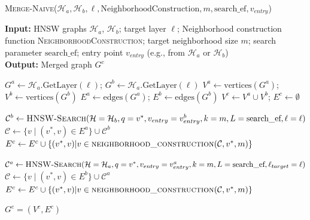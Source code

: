 \documentclass{article}
\begin{document}
\begin{algorithm}
\caption{\textsc{Merge-Naive}($\mathcal{H}_a, \mathcal{H}_b, \ell, \text{NeighborhoodConstruction}, m, \text{search\_ef}, v_{entry}$)}\label{alg:merge_naive}
\textbf{Input:} HNSW graphs $\mathcal{H}_a$, $\mathcal{H}_b$; target layer $\ell$; Neighborhood construction function \textsc{NeighborhoodConstruction}; target neighborhood size $m$; search parameter $\text{search\_ef}$; entry point $v_{entry}$ (e.g., from $\mathcal{H}_a$ or $\mathcal{H}_b$) \\
\textbf{Output:} Merged graph $G^c$
\begin{algorithmic}[1]
\State $G^a \gets \mathcal{H}_a\text{.GetLayer}(\ell) $; $G^b \gets\mathcal{H}_a\text{.GetLayer}(\ell)$ 
\State $V^a \gets \text{vertices}(G^a)$; $V^b \gets \text{vertices}(G^b)$
\State $E^a \gets \text{edges}(G^a)$; $E^b \gets \text{edges}(G^b)$
\State $V^c \gets V^a \cup V^b$; $E^c \gets \emptyset$ 

    \State $\mathcal{C}^b \gets \textsc{HNSW-Search}(\mathcal{H}=\mathcal{H}_b, q=v^*, v_{entry}=v_{entry}^b, k=m, L=\text{search\_ef}, \ell=\ell)$ 
    \State $\mathcal{C} \gets \{v \mid (v^*, v) \in E^a \} \cup \mathcal{C}^b$  
    \State $E^c \gets E^c \cup \{(v^*, v) | v \in \textsc{neighborhood\_construction}(\mathcal{C}, v^*, m)\}$
\EndFor

    \State $\mathcal{C}^a \gets \textsc{HNSW-Search}(\mathcal{H}=\mathcal{H}_a, q=v^*, v_{entry}=v_{entry}^a, k=m, L=\text{search\_ef}, \ell_{target}=\ell)$ 
    \State $\mathcal{C} \gets \{v \mid (v^*, v) \in E^b \} \cup \mathcal{C}^a$  
    \State $E^c \gets E^c \cup \{(v^*, v) | v \in \textsc{neighborhood\_construction}(\mathcal{C}, v^*, m)\}$
\EndFor

\State \Return $G^c = (V^c, E^c)$
\end{algorithmic}
\end{algorithm}
\end{document}

